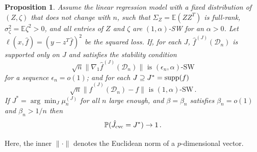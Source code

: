 \documentclass[11pt]{article}
\theoremstyle{plain}
\newtheorem{proposition}[theorem]{Proposition}
\newcommand{\D}{{\mathcal{D}}}
\begin{document}
\begin{proposition}
\label{pro:5.2-cvc-consist}
Assume the linear regression model with a fixed distribution of $(Z,\zeta)$ that does not change with $n$, such that $\Sigma_Z=\mathbb E (Z Z^T)$ is full-rank, $\sigma_\zeta^2=\mathbb E \zeta^2>0$, and all entries of $Z$ and $\zeta$ are $(1,\alpha)$-SW for an $\alpha>0$. Let $\ell(x,\hat f)=(y-z^T\hat f)^2$ be the squared loss.  If, for each $J$, $\hat f^{(J)}(\D_n)$ is supported only on $J$ and satisfies the stability condition
\begin{equation}
    \label{eq:5.2-reg-stab}
    \sqrt{n}\|\nabla_1 \hat f^{(J)}(\D_n)\|\text{ is }(\epsilon_n,\alpha)\text{-SW}
\end{equation} for a sequence $\epsilon_n=o(1)$;
and for each $J\supseteq J^*={\rm supp}(f)$
\begin{equation}\label{eq:5.2-root-n-consist}
\sqrt{n}\|\hat f^{(J)}(\D_n)-f\|\text{ is }(1,\alpha)\text{-SW}\,.
\end{equation}
If $J^*=\arg\min_J \mu_n^{(J)}$ for all $n$ large enough, and $\beta=\beta_n$ satisfies $\beta_n=o(1)$ and $\beta_n>1/n$ then
$$
\mathbb P(\hat J_{\rm cvc}=J^*)\rightarrow 1\,.
$$
\end{proposition}
Here, the inner $\|\cdot\|$ denotes the Euclidean norm of a $p$-dimensional vector.
\end{document}
